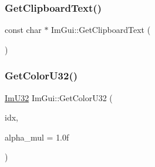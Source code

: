 \mbox{\label{namespace_im_gui_a11837daee819fd90e17d80ab1eef1f99}} 
\subsubsection{\texorpdfstring{Get\+Clipboard\+Text()}{GetClipboardText()}}
{\footnotesize\ttfamily const char $\ast$ Im\+Gui\+::\+Get\+Clipboard\+Text (\begin{DoxyParamCaption}{ }\end{DoxyParamCaption})}

\mbox{\label{namespace_im_gui_a0de2d9bd347d9866511eb8d014e62556}} 
\subsubsection{\texorpdfstring{Get\+Color\+U32()}{GetColorU32()}\hspace{0.1cm}{\footnotesize\ttfamily [1/3]}}
{\footnotesize\ttfamily \mbox{\hyperlink{imgui_8h_a118cff4eeb8d00e7d07ce3d6460eed36}{Im\+U32}} Im\+Gui\+::\+Get\+Color\+U32 (\begin{DoxyParamCaption}\item[{\mbox{\hyperlink{imgui_8h_a1b0467ec582e731ae6292fef726fb5fe}{Im\+Gui\+Col}}}]{idx,  }\item[{float}]{alpha\+\_\+mul = {\ttfamily 1.0f} }\end{DoxyParamCaption})}


